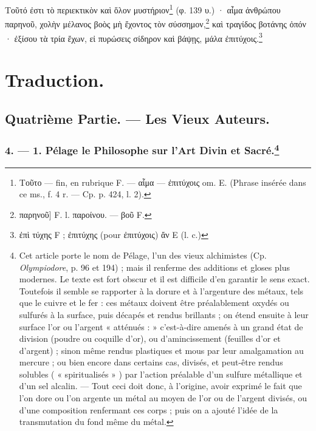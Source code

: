 \documentclass[a4paper, 11pt, oneside, polutonikogreek, french]{article}
\begin{document}
Τοῦτό ἐστι τὸ περιεκτικὸν καὶ ὅλον μυστήριον\footnote{Τοῦτο --- fin, en rubrique F. --- αἷμα --- ἐπιτύχοις om. E. (Phrase insérée dans ce ms., f. 4 r. --- Cp. p. 424, l. 2).} (φ. 139 υ.) · αἷμα ἀνθρώπου παρηνοῦ, χολὴν μέλανος βοὸς μὴ ἔχοντος τὸν σύσσημον,\footnote{παρηνοῦ] F. l. παροίνου. --- βοῦ F.} καὶ τραγίδος βοτάνης ὀπόν · ἐξίσου τὰ τρία ἔχων, εἰ πυρώσεις σίδηρον καὶ βάψῃς, μάλα ἐπιτύχοις.\footnote{ἐπὶ τύχης F ; ἐπιτύχης (pour ἐπιτύχοις) ἄν E (l. c.)}

\section{Traduction.}
\subsection{Quatrième Partie. --- Les Vieux Auteurs.}
\subsubsection[4. --- 1. Pélage le Philosophe sur l'Art Divin et Sacré.]{4. --- 1. Pélage le Philosophe sur l'Art Divin et Sacré.\footnote{Cet article porte le nom de Pélage, l'un des vieux alchimistes (Cp. \emph{Olympiodore}, p. 96 et 194) ; mais il renferme des additions et gloses plus modernes. Le texte est fort obscur et il est difficile d'en garantir le sens exact. Toutefois il semble se rapporter à la dorure et à l'argenture des métaux, tels que le cuivre et le fer : ces métaux doivent être préalablement oxydés ou sulfurés à la surface, puis décapés et rendus brillants ; on étend ensuite à leur surface l'or ou l'argent « atténués : » c'est-à-dire amenés à un grand état de division (poudre ou coquille d'or), ou d'amincissement (feuilles d'or et d'argent) ; sinon même rendus plastiques et mous par leur amalgamation au mercure ; ou bien encore dans certains cas, divisés, et peut-être rendus solubles ( « spiritualisés » ) par l'action préalable d'un sulfure métallique et d'un sel alcalin. --- Tout ceci doit donc, à l'origine, avoir exprimé le fait que l'on dore ou l'on argente un métal au moyen de l'or ou de l'argent divisés, ou d'une composition renfermant ces corps ; puis on a ajouté l'idée de la transmutation du fond même du métal.}}
\end{document}
